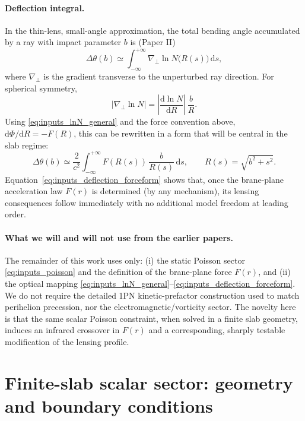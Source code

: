 \documentclass[11pt]{article}
\newcommand{\dd}{\mathrm{d}}
\begin{document}
\paragraph{Deflection integral.}
In the thin-lens, small-angle approximation, the total bending angle accumulated by a ray with
impact parameter $b$ is (Paper II)
\begin{equation}
  \Delta\theta(b)
  \simeq \int_{-\infty}^{+\infty} \nabla_\perp \ln N\bigl(R(s)\bigr)\,\dd s,
  \label{eq:inputs_deflection_general}
\end{equation}
where $\nabla_\perp$ is the gradient transverse to the unperturbed ray direction.
For spherical symmetry,
\begin{equation}
  \left|\nabla_\perp \ln N\right|
  = \left|\frac{\dd \ln N}{\dd R}\right|\,\frac{b}{R}.
\end{equation}
Using \eqref{eq:inputs_lnN_general} and the force convention above, $\dd \Phi/\dd R = -F(R)$, this
can be rewritten in a form that will be central in the slab regime:
\begin{equation}
  \Delta\theta(b)
  \simeq \frac{2}{c^2}\int_{-\infty}^{+\infty}
  F\!\left(R(s)\right)\,\frac{b}{R(s)}\,\dd s,
  \qquad R(s)=\sqrt{b^2+s^2}.
  \label{eq:inputs_deflection_forceform}
\end{equation}
Equation~\eqref{eq:inputs_deflection_forceform} shows that, once the brane-plane acceleration law
$F(r)$ is determined (by any mechanism), its lensing consequences follow immediately with no
additional model freedom at leading order.

\paragraph{What we will and will not use from the earlier papers.}
The remainder of this work uses only:
(i) the static Poisson sector \eqref{eq:inputs_poisson} and the definition of the brane-plane force
$F(r)$, and
(ii) the optical mapping \eqref{eq:inputs_lnN_general}--\eqref{eq:inputs_deflection_forceform}.
We do not require the detailed 1PN kinetic-prefactor construction used to match perihelion
precession, nor the electromagnetic/vorticity sector.
The novelty here is that the same scalar Poisson constraint, when solved in a finite slab geometry,
induces an infrared crossover in $F(r)$ and a corresponding, sharply testable modification of the
lensing profile.

\section{Finite-slab scalar sector: geometry and boundary conditions}
\label{sec:slab_bvp}
\end{document}
